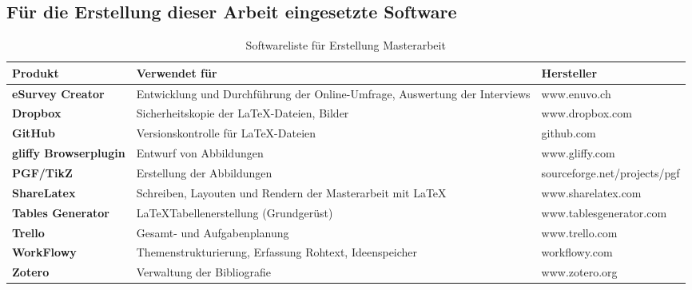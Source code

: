 \documentclass[main.tex]{subfiles}
\begin{document}
\subsection*{Für die Erstellung dieser Arbeit eingesetzte Software}


\begin{table}[H]
\caption{Softwareliste für Erstellung Masterarbeit}
\label{used-sw}


\begin{tabular}{ |p{3cm}|p{8cm}|l| }


\hline
\rowcolor[HTML]{C0C0C0} 
\textbf{Produkt} & \textbf{Verwendet für} & \textbf{Hersteller}\\ 
\hline


\textbf{eSurvey Creator} & Entwicklung und Durchführung der Online-Umfrage, \newline Auswertung der Interviews & www.enuvo.ch\\ \hline
\textbf{Dropbox} & Sicherheitskopie der \LaTeX  -Dateien, Bilder & www.dropbox.com \\ \hline
\textbf{GitHub} & Versionskontrolle für \LaTeX  -Dateien & github.com \\ \hline
\textbf{gliffy Browserplugin} & Entwurf von Abbildungen & www.gliffy.com \\ \hline
\textbf{PGF/TikZ} & Erstellung der Abbildungen & sourceforge.net/projects/pgf \\ \hline
\textbf{ShareLatex} & Schreiben, Layouten und Rendern der Masterarbeit mit \LaTeX & www.sharelatex.com \\ \hline
\textbf{Tables Generator} & \LaTeX Tabellenerstellung (Grundgerüst)  & www.tablesgenerator.com \\ \hline
\textbf{Trello} & Gesamt- und Aufgabenplanung  & www.trello.com \\ \hline
\textbf{WorkFlowy} & Themenstrukturierung, Erfassung Rohtext, Ideenspeicher & workflowy.com \\ \hline
\textbf{Zotero} & Verwaltung der Bibliografie & www.zotero.org \\ \hline

\end{tabular}
\end{table}
\end{document}
